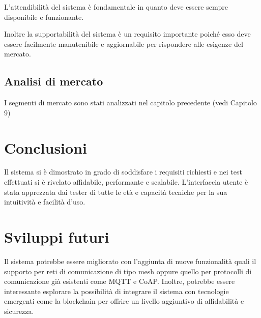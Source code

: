 L'attendibilità del sistema è fondamentale in quanto deve essere sempre disponibile e funzionante.

Inoltre la supportabilità del sistema è un requisito importante poiché esso deve essere facilmente
manutenibile e aggiornabile per rispondere alle esigenze del mercato.

\subsection{Analisi di mercato}

I segmenti di mercato sono stati analizzati nel capitolo precedente (vedi Capitolo 9)


\section{Conclusioni}

Il sistema si è dimostrato in grado di soddisfare i requisiti richiesti e nei test effettuati si è rivelato
affidabile, performante e scalabile. L'interfaccia utente è stata apprezzata dai tester di tutte le età 
e capacità tecniche per la sua intuitività e facilità d'uso. 

\section{Sviluppi futuri}

Il sistema potrebbe essere migliorato con l'aggiunta di nuove funzionalità quali il supporto per reti di 
comunicazione di tipo mesh oppure quello per protocolli di comunicazione già esistenti come MQTT e CoAP.
Inoltre, potrebbe essere interessante esplorare la possibilità di integrare il sistema con tecnologie emergenti
come la blockchain per offrire un livello aggiuntivo di affidabilità e sicurezza.
